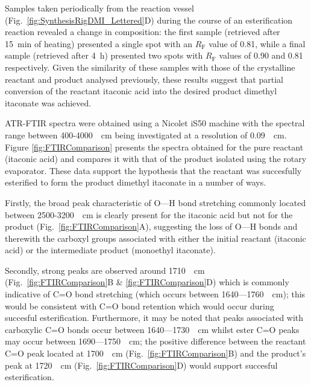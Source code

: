Samples taken periodically from the reaction vessel
 (Fig.~\ref{fig:SynthesisRigDMI_Lettered}D) during the course of an
 esterification reaction revealed a change in composition: the first sample
 (retrieved after 15~\unit{\minute} of heating) presented a single spot with
 an \(R_{\mathrm{F}}\) value of 0.81, while a final sample (retrieved after 
 4~\unit{\hour}) presented two spots with \(R_{\mathrm{F}}\) values of 0.90 and 0.81
 respectively.
Given the similarity of these samples with those of the crystalline
 reactant and product analysed previously, these results suggest that
 partial conversion of the reactant itaconic acid into the desired product
 dimethyl itaconate was achieved.

ATR-FTIR spectra were obtained using a Nicolet iS50 machine with the 
 spectral range between 400-4000~\unit{\per\centi\metre} being investigated
 at a resolution of 0.09~\unit{\per\centi\metre}.
Figure \ref{fig:FTIRComparison} presents the spectra obtained for the pure
 reactant (itaconic acid) and compares it with that of the product
 isolated using the rotary evaporator. 
These data support the hypothesis that the reactant was succesfully 
 esterified to form the product dimethyl itaconate in a number of ways.

Firstly, the broad peak characteristic of O---H bond stretching commonly
 located between 2500-3200~\unit{\per\centi\metre} is clearly
 present for the itaconic acid but not for the product
 (Fig.~\ref{fig:FTIRComparison}A), suggesting the loss of O---H bonds
 and therewith the carboxyl groups associated with either the initial
 reactant (itaconic acid) or the intermediate product (monoethyl itaconate).

Secondly, strong peaks are observed around 1710~\unit{\per\centi\metre}
 (Fig.~\ref{fig:FTIRComparison}B \& \ref{fig:FTIRComparison}D) which
 is commonly indicative of C=O bond stretching (which occurs between 
 1640---1760~\unit{\per\centi\metre}); this would be consistent with C=O
 bond retention which would occur during succesful esterification.
Furthermore, it may be noted that peaks associated with carboxylic C=O bonds
 occur between 1640---1730~\unit{\per\centi\metre} whilst ester C=O peaks
 may occur between 1690---1750~\unit{\per\centi\metre}; the positive difference
 between the reactant C=O peak located at 1700~\unit{\per\centi\metre}
 (Fig.~\ref{fig:FTIRComparison}B) and the product's peak at
 1720~\unit{\per\centi\metre} (Fig.~\ref{fig:FTIRComparison}D) would
 support succesful esterification.

